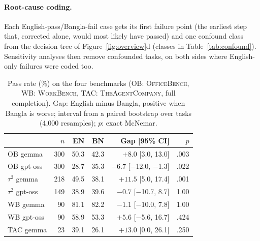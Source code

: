 \documentclass[11pt]{article}
\begin{document}
\paragraph{Root-cause coding.} Each English-pass/Bangla-fail case gets its first failure point
(the earliest step that, corrected alone, would most likely have passed) and one confound class
from the decision tree of Figure~\ref{fig:overview}d (classes in Table~\ref{tab:confound}).
Sensitivity analyses then remove confounded tasks, on both sides where English-only failures
were coded too.

\begin{table}[t]
\centering\footnotesize
\setlength{\tabcolsep}{2.4pt}
\begin{tabular}{lrrrrr}
\toprule
 & $n$ & EN & BN & Gap [95\% CI] & $p$ \\
\midrule
OB gemma     & 300 & 50.3 & 42.3 & $+8.0$ [3.0, 13.0]      & .003 \\
OB gpt-oss   & 300 & 28.7 & 35.3 & $-6.7$ [$-$12.0, $-$1.3] & .022 \\
$\tau^2$ gemma   & 218 & 49.5 & 38.1 & $+11.5$ [5.0, 17.4]   & .001 \\
$\tau^2$ gpt-oss & 149 & 38.9 & 39.6 & $-0.7$ [$-$10.7, 8.7] & 1.00 \\
WB gemma     & 90  & 81.1 & 82.2 & $-1.1$ [$-$10.0, 7.8]   & 1.00 \\
WB gpt-oss   & 90  & 58.9 & 53.3 & $+5.6$ [$-$5.6, 16.7]   & .424 \\
TAC gemma    & 23  & 39.1 & 26.1 & $+13.0$ [0.0, 26.1]     & .250 \\
\bottomrule
\end{tabular}
\caption{Pass rate (\%) on the four benchmarks (OB: \textsc{OfficeBench}, WB:
\textsc{WorkBench}, TAC: \textsc{TheAgentCompany}, full completion). Gap: English minus Bangla,
positive when Bangla is worse; interval from a paired bootstrap over tasks (4{,}000 resamples);
$p$: exact McNemar.}
\label{tab:four}
\end{table}
\end{document}
